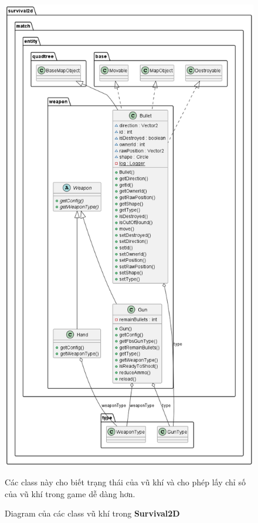 \documentclass[12pt,a4paper]{article}
\begin{document}
  \begin{figure}[H]
    \centering
    \includegraphics[width=\textwidth,height=0.9\textheight,keepaspectratio]{Img/uml/weapon.png}
    \caption{Diagram của các class vũ khí trong \textbf{Survival2D}}
    Các class này cho biết trạng thái của vũ khí và cho phép lấy chỉ số của vũ khí trong game dễ dàng hơn.
  \end{figure}
\end{document}
